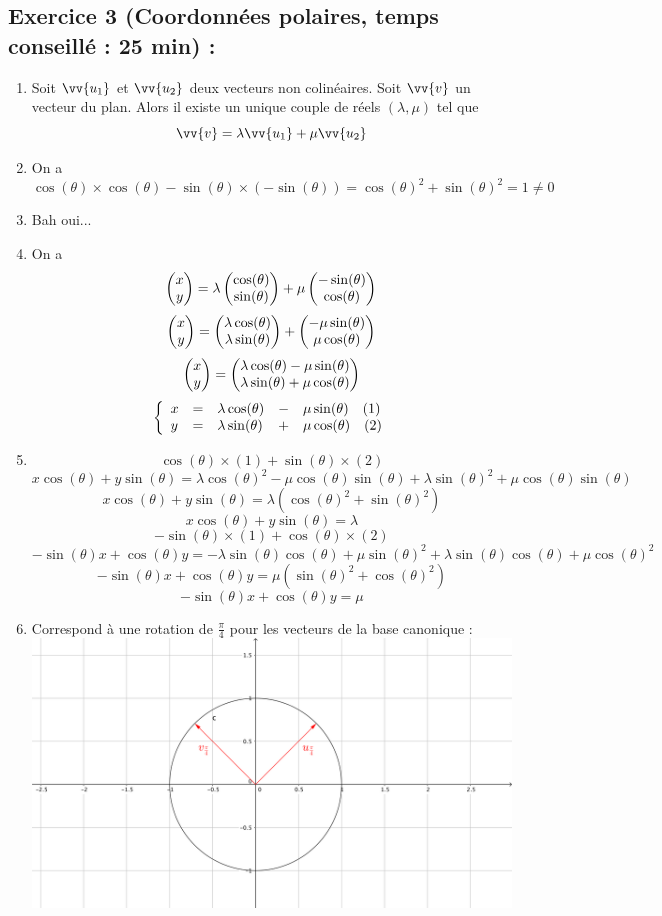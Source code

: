 \subsection*{Exercice 3 (Coordonnées polaires, temps conseillé : 25 min) : }
\begin{enumerate}
\item Soit $\vv{u_1}$ et $\vv{u_2}$ deux vecteurs non colinéaires. Soit $\vv{v}$ un vecteur du plan. Alors il existe un unique couple de réels $(\lambda,\mu)$ tel que $$\vv{v} = \lambda \vv{u_1} + \mu \vv{u_2}$$
\item On a $$\cos(\theta) \times \cos(\theta) - \sin(\theta)\times (-\sin(\theta)) = \cos(\theta)^2 + \sin(\theta)^2 = 1 \neq 0$$
\item Bah oui...
\item On a $$\begin{pmatrix}x \\y \end{pmatrix} = \lambda \begin{pmatrix}\cos(\theta) \\\sin(\theta) \end{pmatrix} + \mu \begin{pmatrix}-\sin(\theta) \\\cos(\theta) \end{pmatrix}$$
$$\begin{pmatrix}x \\y \end{pmatrix} =  \begin{pmatrix}\lambda\cos(\theta) \\\lambda\sin(\theta) \end{pmatrix} +  \begin{pmatrix}-\mu\sin(\theta) \\\mu\cos(\theta) \end{pmatrix}$$
$$\begin{pmatrix}x \\y \end{pmatrix} =  \begin{pmatrix}\lambda\cos(\theta)-\mu\sin(\theta) \\\lambda\sin(\theta) +\mu\cos(\theta) \end{pmatrix}$$
$$\left\{\begin{array}{l l l l l} x & = & \lambda \cos(\theta) & - & \mu \sin(\theta) \quad (1) \\ y & = & \lambda \sin(\theta) & + &\mu \cos(\theta) \quad (2)\end{array}\right.$$
\item 
$$\cos(\theta) \times (1) + \sin(\theta) \times (2)$$
$$x\cos(\theta) + y \sin(\theta) = \lambda\cos(\theta)^2 -\mu\cos(\theta)\sin(\theta) + \lambda \sin(\theta)^2 + \mu\cos(\theta)\sin(\theta)$$
$$x\cos(\theta) + y \sin(\theta) = \lambda(\cos(\theta)^2 + \sin(\theta)^2)$$
$$\boxed{x\cos(\theta) + y \sin(\theta) = \lambda}$$
$$-\sin(\theta) \times (1) + \cos(\theta) \times (2)$$
$$-\sin(\theta)x + \cos(\theta)y = -\lambda \sin(\theta)\cos(\theta) + \mu \sin(\theta)^2 + \lambda \sin(\theta) \cos(\theta) + \mu \cos(\theta)^2$$
$$-\sin(\theta)x + \cos(\theta)y = \mu(\sin(\theta)^2 + \cos(\theta)^2)$$
$$\boxed{-\sin(\theta)x + \cos(\theta)y = \mu}$$
\item Correspond à une rotation de $\frac{\pi}{4}$ pour les vecteurs de la base canonique :\newline
\includegraphics[scale=0.2]{chap5_corr_ill1.png}

\end{enumerate}
